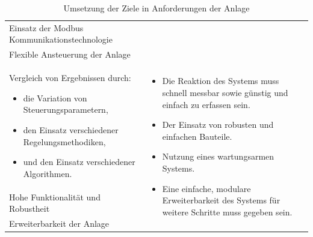 \begin{table}[H]
\begin{tabularx}{1\textwidth}{m{}m{}}
\cmidrule[0.1pt](lr{2em}){1-1}
\addlinespace[4mm] Einsatz der Modbus \newline Kommunikationstechnologie \newline 	& 		\\

\cmidrule[0.1pt](lr{2em}){1-1}
\addlinespace[4mm] Flexible Ansteuerung der Anlage \newline & \\


\cmidrule[0.5pt](r{0.25em}){1-1} 
\cmidrule[0.5pt](l{0.25em}){2-2}

Vergleich von Ergebnissen durch:
\begin{minipage}[t]{0.34\textwidth}
\begin{itemize}[itemsep=0pt,topsep=1pt,leftmargin=4mm]
	\item die Variation von \newline Steuerungsparametern,
	\item den Einsatz verschiedener \newline Regelungsmethodiken,
	\item und den Einsatz \newline verschiedener Algorithmen.
\end{itemize}
\end{minipage}

& \multirow{3}{\hsize}{
\begin{minipage}[t]{0.57\textwidth}
\begin{itemize}[itemsep=0pt,topsep=0pt,leftmargin=5mm]
\item Die Reaktion des Systems muss schnell messbar sowie günstig und einfach zu erfassen sein.
\item Der Einsatz von robusten und einfachen Bauteile.
\item Nutzung eines wartungsarmen Systems.
\item Eine einfache, modulare Erweiterbarkeit des Systems für weitere Schritte muss gegeben sein.
\end{itemize}
\end{minipage}
}  \\

\cmidrule[0.1pt](lr{2em}){1-1} 

Hohe Funktionalität und \newline Robustheit & \\

\cmidrule[0.1pt](lr{2em}){1-1} 

Erweiterbarkeit der Anlage
 &  \\

\bottomrule
\end{tabularx}
\caption{Umsetzung der Ziele in Anforderungen der Anlage}
\label{tab:anforderungen_umgebung}
\end{table}

